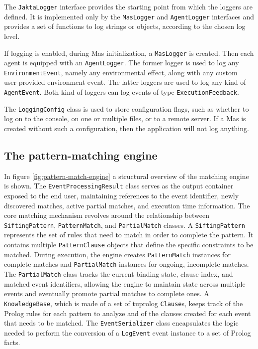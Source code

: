 \documentclass{scrartcl}
\begin{document}
The \verb|JaktaLogger| interface provides the starting point from which the loggers are defined. It is implemented only by the \verb|MasLogger| and \verb|AgentLogger| interfaces and provides a set of functions to log strings or objects, according to the chosen log level.

If logging is enabled, during Mas initialization, a \verb|MasLogger| is created. Then each agent is equipped with an \verb|AgentLogger|. 
%
The former logger is used to log any \verb|EnvironmentEvent|,  namely any environmental effect, along with any custom user-provided environment event. The latter loggers are used to log any kind of \verb|AgentEvent|.
%
Both kind of loggers can log events of type \verb|ExecutionFeedback|.

The \verb|LoggingConfig| class is used to store configuration flags, such as whether to log on to the console, on one or multiple files, or to a remote server. If a Mas is created without such a configuration, then the application will not log anything.

\subsection{The pattern-matching engine}

In figure \ref{fig:pattern-match-engine} a structural overview of the matching engine is shown.
%
The \verb|EventProcessingResult| class serves as the output container exposed to the end user, maintaining references to the event identifier, newly discovered matches, active partial matches, and execution time information.
%
The core matching mechanism revolves around the relationship between \verb|SiftingPattern|, \verb|PatternMatch|, and \verb|PartialMatch| classes.
%
A \verb|SiftingPattern| represents the set of rules that need to match in order to complete the pattern. 
%
It contains multiple \verb|PatternClause| objects that define the specific constraints to be matched. 
%
During execution, the engine creates \verb|PatternMatch| instances for complete matches and \verb|PartialMatch| instances for ongoing, incomplete matches. 
%
The \verb|PartialMatch| class tracks the current binding state, clause index, and matched event identifiers, allowing the engine to maintain state across multiple events and eventually promote partial matches to complete ones.
%
A \verb|KnowledgeBase|, which is made of a set of tuprolog \verb|Clause|s, keeps track of the Prolog rules for each pattern to analyze and of the clauses created for each event that needs to be matched.
%
The \verb|EventSerializer| class encapsulates the logic needed to perform the conversion of a \verb|LogEvent| event instance to a set of Prolog facts.
\end{document}
